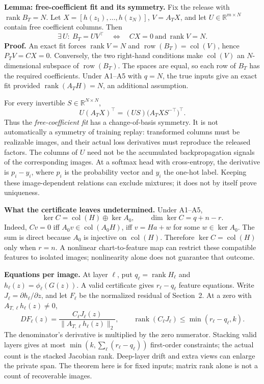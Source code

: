 \documentclass[11pt,a4paper]{article}
\newcommand{\rank}{\operatorname{rank}}
\newcommand{\col}{\operatorname{col}}
\newcommand{\row}{\operatorname{row}}
\begin{document}
\textbf{Lemma: free-coefficient fit and its symmetry.} Fix the release with
\(\rank B_T=N\). Let \(X=[h(z_1),\ldots,h(z_N)]\), \(V=A_TX\), and
let \(U\in\mathbb R^{m\times N}\) contain free coefficient columns. Then
\[
\exists\,U:\ B_T=UV^\top
\quad\Longleftrightarrow\quad CX=0\ \text{and}\ \rank V=N.
\]
\textbf{Proof.} An exact fit forces \(\rank V=N\) and
\(\row(B_T)=\col(V)\), hence \(P_TV=CX=0\).
Conversely, the two right-hand conditions make \(\col(V)\) an
\(N\)-dimensional subspace of \(\row(B_T)\). The spaces are equal, so
each row of \(B_T\) has the required coefficients.
Under A1--A5 with \(q=N\), the true inputs give an exact fit provided
\(\rank(A_TH)=N\), an additional assumption.

For every invertible \(S\in\mathbb R^{N\times N}\),
\[
U(A_TX)^\top=(US)\bigl(A_T X S^{-\top}\bigr)^\top.
\]
Thus the \emph{free-coefficient fit} has a change-of-basis symmetry.
It is not automatically a symmetry of training replay: transformed columns must
be realizable images, and their actual loss derivatives must reproduce the
released factors. The columns of \(U\) need not be the accumulated backpropagation
signals of the corresponding images. At a softmax head with cross-entropy,
the derivative is \(p_i-y_i\), where \(p_i\) is the probability vector and
\(y_i\) the one-hot label. Keeping these image-dependent relations can exclude
mixtures; it does not by itself prove uniqueness.

\textbf{What the certificate leaves undetermined.} Under A1--A5,
\[
\ker C=\col(H)\oplus\ker A_0,\qquad \dim\ker C=q+n-r.
\]
Indeed, \(Cv=0\) iff \(A_0v\in\col(A_0H)\), iff
\(v=Ha+w\) for some \(w\in\ker A_0\). The sum is direct because
\(A_0\) is injective on \(\col(H)\).
Therefore \(\ker C=\col(H)\) only when \(r=n\).
A nonlinear chart-to-feature map can restrict these compatible features to
isolated images; nonlinearity alone does not guarantee that outcome.

\textbf{Equations per image.} At layer \(\ell\), put
\(q_\ell=\rank H_\ell\) and \(h_\ell(z)=\phi_\ell(G(z))\).
A valid certificate gives \(r_\ell-q_\ell\) feature equations. Write
\(J_\ell=\partial h_\ell/\partial z\), and let \(F_\ell\) be the normalized
residual of Section~2. At a zero with \(A_{T,\ell}h_\ell(z)\ne0\),
\[
DF_\ell(z)=\frac{C_\ell J_\ell(z)}{\|A_{T,\ell}h_\ell(z)\|_2},\qquad
\rank(C_\ell J_\ell)\le\min(r_\ell-q_\ell,k).
\]
The denominator's derivative is multiplied by the zero numerator. Stacking
valid layers gives at most \(\min(k,\sum_\ell(r_\ell-q_\ell))\) first-order
constraints; the actual count is the stacked Jacobian rank.
Deep-layer drift and extra views can enlarge the private span. The theorem
here is for fixed inputs; matrix rank alone is not a count of recoverable images.
\end{document}
